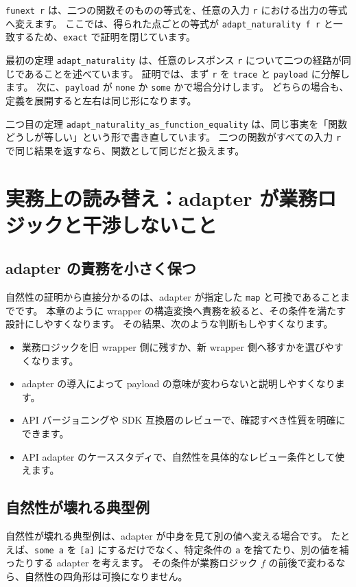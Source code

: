 \texttt{funext r} は、二つの関数そのものの等式を、任意の入力 \texttt{r} における出力の等式へ変えます。
ここでは、得られた点ごとの等式が \texttt{adapt\_naturality f r} と一致するため、\texttt{exact} で証明を閉じています。

最初の定理 \texttt{adapt\_naturality} は、任意のレスポンス \texttt{r} について二つの経路が同じであることを述べています。
証明では、まず \texttt{r} を \texttt{trace} と \texttt{payload} に分解します。
次に、\texttt{payload} が \texttt{none} か \texttt{some} かで場合分けします。
どちらの場合も、定義を展開すると左右は同じ形になります。

二つ目の定理 \texttt{adapt\_naturality\_as\_function\_equality} は、同じ事実を「関数どうしが等しい」という形で書き直しています。
二つの関数がすべての入力 \texttt{r} で同じ結果を返すなら、関数として同じだと扱えます。

\section{実務上の読み替え：adapter が業務ロジックと干渉しないこと}

\subsection{adapter の責務を小さく保つ}

自然性の証明から直接分かるのは、adapter が指定した \texttt{map} と可換であることまでです。
本章のように wrapper の構造変換へ責務を絞ると、その条件を満たす設計にしやすくなります。
その結果、次のような判断もしやすくなります。

\begin{itemize}
\item 業務ロジックを旧 wrapper 側に残すか、新 wrapper 側へ移すかを選びやすくなります。
\item adapter の導入によって payload の意味が変わらないと説明しやすくなります。
\item API バージョニングや SDK 互換層のレビューで、確認すべき性質を明確にできます。
\item API adapter のケーススタディで、自然性を具体的なレビュー条件として使えます。
\end{itemize}

\subsection{自然性が壊れる典型例}

自然性が壊れる典型例は、adapter が中身を見て別の値へ変える場合です。
たとえば、\texttt{some a} を \texttt{[a]} にするだけでなく、特定条件の \texttt{a} を捨てたり、別の値を補ったりする adapter を考えます。
その条件が業務ロジック \(f\) の前後で変わるなら、自然性の四角形は可換になりません。


